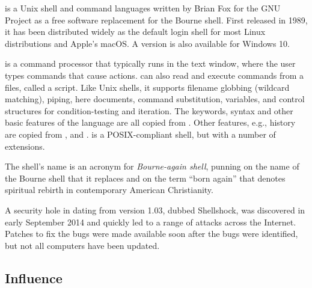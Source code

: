 \documentclass[../Languages.tex]{subfiles}
\begin{document}
\label{sec:bash}

 is a Unix shell and command languages written by Brian Fox for the
GNU Project as a free software replacement for the Bourne shell. First released
in 1989, it has been distributed widely as the default login shell for most
Linux distributions and Apple's macOS. A version is also available for Windows
10.

 is a command processor that typically runs in the text window, where
the user types commands that cause actions.  can also read and execute
commands from a files, called a script. Like Unix shells, it supports filename
globbing (wildcard matching), piping, here documents, command substitution,
variables, and control structures for condition-testing and iteration. The
keywords, syntax and other basic features of the language are all copied from
. Other features, e.g., history are copied from , and .
 is a POSIX-compliant shell, but with a number of extensions.

The shell's name is an acronym for \textit{Bourne-again shell}, punning on the
name of the Bourne shell that it replaces and on the term ``born again'' that
denotes spiritual rebirth in contemporary American Christianity.

A security hole in  dating from version 1.03, dubbed Shellshock, was
discovered in early September 2014 and quickly led to a range of attacks across
the Internet. Patches to fix the bugs were made available soon after the bugs
were identified, but not all computers have been updated.

\subsection{Influence}
\label{sub:influence}
\end{document}
